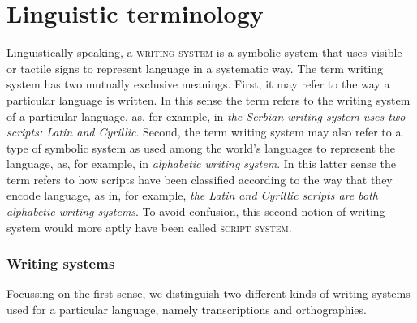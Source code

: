 \section{Linguistic terminology}
\label{linguistic-terminology}

Linguistically speaking, a \textsc{writing system} is a symbolic system that
uses visible or tactile signs to represent language in a systematic way. The
term writing system has two mutually exclusive meanings. First, it may
refer to the way a particular language is written. In this sense the term refers
to the writing system of a particular language, as, for example, in \emph{the
Serbian writing system uses two scripts: Latin and Cyrillic}. Second, the term
writing system may also refer to a type of symbolic system as used among the
world's languages to represent the language, as, for example, in
\emph{alphabetic writing system}. In this latter sense the term refers to how
scripts have been classified according to the way that they encode language, as
in, for example, \emph{the Latin and Cyrillic scripts are both alphabetic
writing systems}. To avoid confusion, this second notion of writing system
would more aptly have been called \textsc{script system}. 

\subsubsection*{Writing systems}

Focussing on the first sense, we distinguish two different kinds of 
writing systems used for a particular language, namely transcriptions and
orthographies.

